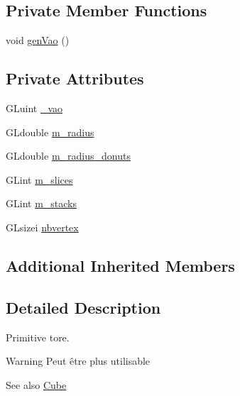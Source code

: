 \subsection*{Private Member Functions}
\begin{DoxyCompactItemize}
\item 
void \hyperlink{class_donuts_aff7950429cf43ee2898c6f1a6545b174}{gen\+Vao} ()
\end{DoxyCompactItemize}
\subsection*{Private Attributes}
\begin{DoxyCompactItemize}
\item 
G\+Luint \hyperlink{class_donuts_a659c70b043ddc2ebcdc64bcb58c1e621}{\+\_\+vao}
\item 
G\+Ldouble \hyperlink{class_donuts_ae3db8d4ea17228ed43d388bac7fb35b3}{m\+\_\+radius}
\item 
G\+Ldouble \hyperlink{class_donuts_a5050c790a74b5313a06b818a7f3e8723}{m\+\_\+radius\+\_\+donuts}
\item 
G\+Lint \hyperlink{class_donuts_a2214ac47effb92c5de33fa7c57d28694}{m\+\_\+slices}
\item 
G\+Lint \hyperlink{class_donuts_a5273bc3a4bdada5e4302b35d49bdd550}{m\+\_\+stacks}
\item 
G\+Lsizei \hyperlink{class_donuts_aac0118d276a512d287a9bc1f4c7d249d}{nbvertex}
\end{DoxyCompactItemize}
\subsection*{Additional Inherited Members}


\subsection{Detailed Description}
Primitive tore. 

\begin{DoxyWarning}{Warning}
Peut être plus utilisable 
\end{DoxyWarning}
\begin{DoxySeeAlso}{See also}
\hyperlink{class_cube}{Cube} 
\end{DoxySeeAlso}


